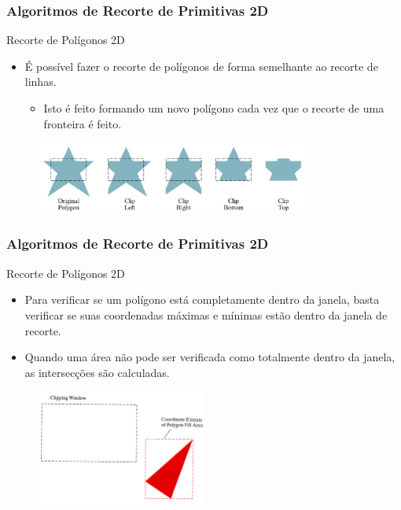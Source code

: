 \documentclass{beamer}
\begin{document}
\begin{frame}
\frametitle{Algoritmos de Recorte de Primitivas 2D}

	\begin{block}{Recorte de Polígonos 2D}
		\begin{itemize}
			\item É possível fazer o recorte de polígonos de forma semelhante ao recorte de linhas.
			\begin{itemize}
				\item Isto é feito formando um novo polígono cada vez que o recorte de uma fronteira é feito.
			\end{itemize}
		\end{itemize}
	\end{block}
	
	\begin{figure}[!h]
			\begin{center}
				\includegraphics[width=0.8\textwidth]{Figures/RecPol2}
			\end{center}
	\end{figure}	
	
\end{frame}

\begin{frame}
\frametitle{Algoritmos de Recorte de Primitivas 2D}

	\begin{block}{Recorte de Polígonos 2D}
		\begin{itemize}
			\item Para verificar se um polígono está completamente dentro da janela, basta verificar se suas coordenadas máximas e mínimas estão dentro da janela de recorte.
			\item Quando uma área não pode ser verificada como totalmente dentro da janela, as intersecções são calculadas.
		\end{itemize}
	\end{block}
	
	\begin{figure}[!h]
			\begin{center}
				\includegraphics[width=0.5\textwidth]{Figures/RecPolAre}
			\end{center}
	\end{figure}
\end{frame}
\end{document}

